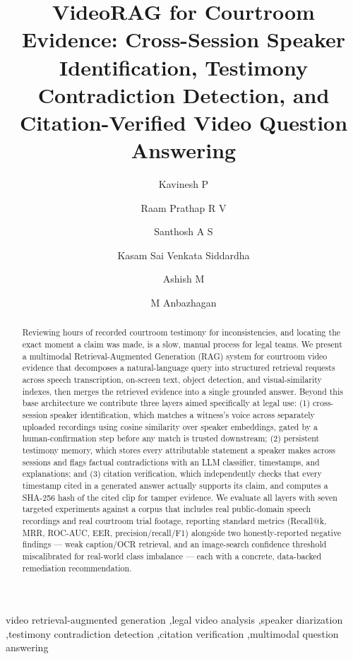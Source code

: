 \documentclass[3p,times,procedia]{elsarticle}
\begin{document}
\begin{frontmatter}


\title{VideoRAG for Courtroom Evidence: Cross-Session Speaker Identification, Testimony Contradiction Detection, and Citation-Verified Video Question Answering}

\author[a]{Kavinesh P}
\author[a]{Raam Prathap R V}
\author[a]{Santhosh A S}
\author[a]{Kasam Sai Venkata Siddardha}
\author[a]{Ashish M}
\author[a]{M Anbazhagan}

\address[a]{Department of Computer Science and Engineering, Amrita School of Computing, Coimbatore 641112, Amrita Vishwa Vidyapeetham, India}

\begin{abstract}
Reviewing hours of recorded courtroom testimony for inconsistencies, and locating the
exact moment a claim was made, is a slow, manual process for legal teams. We present a
multimodal Retrieval-Augmented Generation (RAG) system for courtroom video evidence
that decomposes a natural-language query into structured retrieval requests across
speech transcription, on-screen text, object detection, and visual-similarity indexes,
then merges the retrieved evidence into a single grounded answer. Beyond this base
architecture we contribute three layers aimed specifically at legal use: (1)
cross-session speaker identification, which matches a witness's voice across separately
uploaded recordings using cosine similarity over speaker embeddings, gated by a
human-confirmation step before any match is trusted downstream; (2) persistent
testimony memory, which stores every attributable statement a speaker makes across
sessions and flags factual contradictions with an LLM classifier, timestamps, and
explanations; and (3) citation verification, which independently checks that every
timestamp cited in a generated answer actually supports its claim, and computes a
SHA-256 hash of the cited clip for tamper evidence. We evaluate all layers with seven
targeted experiments against a corpus that includes real public-domain speech
recordings and real courtroom trial footage, reporting standard metrics (Recall@k,
MRR, ROC-AUC, EER, precision/recall/F1) alongside two honestly-reported negative
findings — weak caption/OCR retrieval, and an image-search confidence threshold
miscalibrated for real-world class imbalance — each with a concrete, data-backed
remediation recommendation.
\end{abstract}

\begin{keyword}
video retrieval-augmented generation \sep legal video analysis \sep speaker diarization \sep testimony contradiction detection \sep citation verification \sep multimodal question answering
\end{keyword}
\end{frontmatter}
\end{document}
